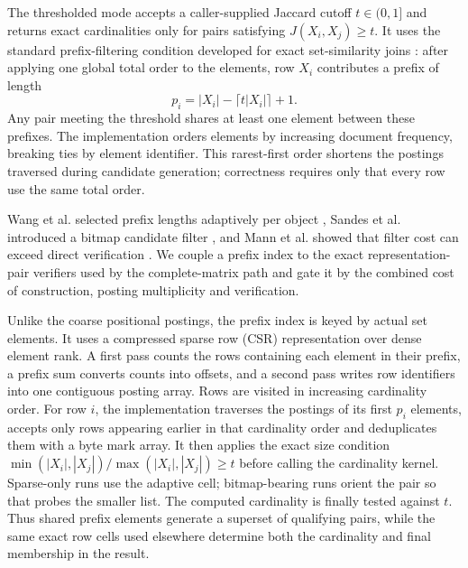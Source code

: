 The thresholded mode accepts a caller-supplied Jaccard cutoff $t\in(0,1]$ and returns exact
cardinalities only for pairs satisfying $J(X_i,X_j)\ge t$. It uses the standard prefix-filtering
condition developed for exact set-similarity joins
\cite{sarawagi2004setjoins,arasu2006exact,bayardo2007allpairs,xiao2008ppjoin,xiao2011ppjoin}: after applying one global total order to the
elements, row $X_i$ contributes a prefix of length
\begin{equation}
p_i=|X_i|-\lceil t|X_i|\rceil+1.
\label{eq:prefix-length}
\end{equation}
Any pair meeting the threshold shares at least one element between these prefixes. The implementation
orders elements by increasing document frequency, breaking ties by element identifier. This
rarest-first order shortens the postings traversed during candidate generation; correctness requires
only that every row use the same total order.

Wang et al. selected prefix lengths adaptively per object \cite{wang2012adaptjoin}, Sandes et al.
introduced a bitmap candidate filter \cite{sandes2020bitmapfilter}, and Mann et al. showed that filter
cost can exceed direct verification \cite{mann2016empirical}. We couple a prefix index to the exact
representation-pair verifiers used by the complete-matrix path and gate it by the combined cost of
construction, posting multiplicity and verification.

Unlike the coarse positional postings, the prefix index is keyed by actual set elements. It uses a
compressed sparse row (CSR) representation over dense element rank. A first
pass counts the rows containing each element in their prefix, a prefix sum converts counts into
offsets, and a second pass writes row identifiers into one contiguous posting array. Rows are visited
in increasing cardinality order. For row $i$, the implementation traverses the postings of its first
$p_i$ elements, accepts only rows appearing earlier in that cardinality order and deduplicates them
with a byte mark array. It then applies the exact size condition
$\min(|X_i|,|X_j|)/\max(|X_i|,|X_j|)\ge t$ before calling the cardinality kernel. Sparse-only runs use
the adaptive \cell{\rS}{\rS} cell; bitmap-bearing runs orient the pair so that \cell{\rB}{\rS}
probes the smaller list. The computed cardinality is finally tested against $t$. Thus shared prefix
elements generate a superset of qualifying pairs, while the same exact row cells used elsewhere
determine both the cardinality and final membership in the result.

